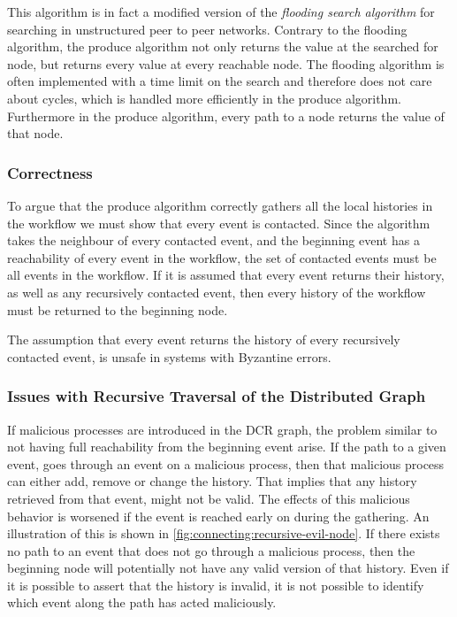 	\newpar This algorithm is in fact a modified version of the \textit{flooding search algorithm}  for searching in unstructured peer to peer networks. Contrary to the flooding algorithm, the produce algorithm not only returns the value at the searched for node, but returns every value at every reachable node. The flooding algorithm is often implemented with a time limit on the search and therefore does not care about cycles, which is handled more efficiently in the produce algorithm. Furthermore in the produce algorithm, every path to a node returns the value of that node. 
	
	\subsubsection{Correctness}
	To argue that the produce algorithm correctly gathers all the local histories in the workflow we must show that every event is contacted. Since the algorithm takes the neighbour of every contacted event, and the beginning event has a reachability of every event in the workflow, the set of contacted events must be all events in the workflow. If it is assumed that every event returns their history, as well as any recursively contacted event, then every history of the workflow must be returned to the beginning node. 
	
	The assumption that every event returns the history of every recursively contacted event, is unsafe in systems with Byzantine errors.
	
	\subsubsection{Issues with Recursive Traversal of the Distributed Graph}
	
	If malicious processes are introduced in the DCR graph, the problem similar to not having full reachability from the beginning event arise. If the path to a given event, goes through an event on a malicious process, then that malicious process can either add, remove or change the history. That implies that any history retrieved from that event, might not be valid. The effects of this malicious behavior is worsened if the event is reached early on during the gathering. An illustration of this is shown in \autoref{fig:connecting:recursive-evil-node}. If there exists no path to an event that does not go through a malicious process, then the beginning node will potentially not have any valid version of that history. Even if it is possible to assert that the history is invalid, it is not possible to identify which event along the path has acted maliciously.
	
